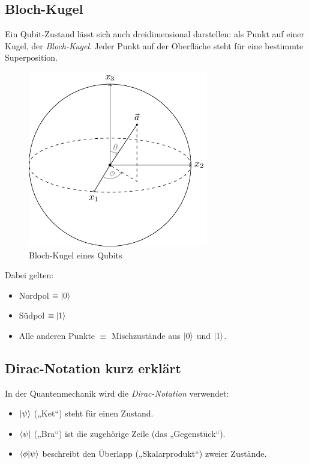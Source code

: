 \subsection{Bloch-Kugel}
Ein Qubit-Zustand lässt sich auch dreidimensional darstellen: als Punkt auf einer Kugel, der \emph{Bloch-Kugel}. Jeder Punkt auf der Oberfläche steht für eine bestimmte Superposition.

\begin{figure}[H]
  \centering
  \includegraphics[width=0.7\textwidth]{images/quantum-information/bloch-sphere_quanteninformationen.png}
  \caption{Bloch-Kugel eines Qubits}\label{fig:bloch-sphere}
\end{figure}

Dabei gelten:
\begin{itemize}
  \item Nordpol \(\equiv \ket{0}\)
  \item Südpol \(\equiv \ket{1}\)
  \item Alle anderen Punkte \(\equiv\) Mischzustände aus \(\ket{0}\) und \(\ket{1}\).
\end{itemize}

\subsection{Dirac-Notation kurz erklärt}
In der Quantenmechanik wird die \emph{Dirac-Notation} verwendet:
\begin{itemize}
  \item \(\ket{\psi}\) („Ket“) steht für einen Zustand.
  \item \(\bra{\psi}\) („Bra“) ist die zugehörige Zeile (das „Gegenstück“).
  \item \(\braket{\phi|\psi}\) beschreibt den Überlapp („Skalarprodukt“) zweier Zustände.
\end{itemize}

